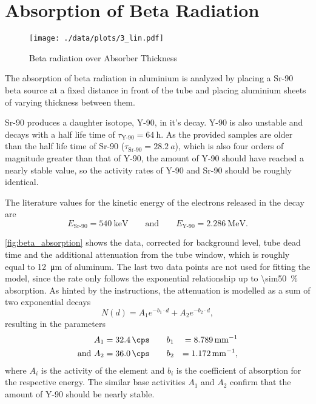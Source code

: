 \chapter{Absorption of Beta Radiation}

\begin{figure}[ht!]
	\centering
	\texttt{[image: ./data/plots/3\_lin.pdf]}
	\caption{Beta radiation over Absorber Thickness}
	\label{fig:beta_absorption}
\end{figure}

The absorption of beta radiation in aluminium is analyzed by placing a Sr-90 beta source at a fixed distance in front of the tube and placing aluminium sheets of varying thickness between them.

Sr-90 produces a daughter isotope, Y-90, in it's decay. Y-90 is also unstable and decays with a half life time of $\tau_\text{Y-90} = \SI{64}{\hour}$.
As the provided samples are older than the half life time of Sr-90 ($\tau_\text{Sr-90} = \SI{28.2}{a}$), which is also four orders of magnitude greater than that of Y-90, the amount of Y-90 should have reached a nearly stable value, so the activity rates of Y-90 and Sr-90 should be roughly identical.

The literature values for the kinetic energy of the electrons released in the decay are
\begin{equation*}
	E_\text{Sr-90} = \SI{540}{\keV} \qquad \text{and} \qquad E_\text{Y-90} = \SI{2.286}{\MeV}.
\end{equation*}

\autoref{fig:beta_absorption} shows the data, corrected for background level, tube dead time and the additional attenuation from the tube window, which is roughly equal to \SI{12}{\micro\meter} of aluminum.
The last two data points are not used for fitting the model, since the rate only follows the exponential relationship up to \SI{\sim50}{\percent} absorption.
As hinted by the instructions, the attenuation is modelled as a sum of two exponential decays
\begin{equation*}
	N(d) = A_1 e^{-b_1 \cdot d} + A_2 e^{-b_2 \cdot d},
\end{equation*}
resulting in the parameters
\begin{alignat*}{2}
	A_1 &= \SI{32.4}{\cps} \qquad b_1 &= \SI{8.789}{\milli\meter^{-1}}\\
	\text{and } A_2 &= \SI{36.0}{\cps} \qquad b_2 &= \SI{1.172}{\milli\meter^{-1}},
\end{alignat*}
where $A_i$ is the activity of the element and $b_i$ is the coefficient of absorption for the respective energy.
The similar base activities $A_1$ and $A_2$ confirm that the amount of Y-90 should be nearly stable.

